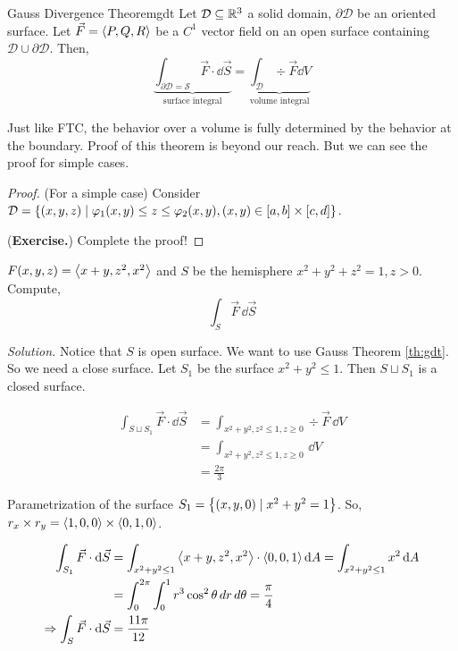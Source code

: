 \documentclass[../Analysis-3.tex]{subfiles}
\begin{document}
\begin{Thm}{Gauss Divergence Theorem}{gdt}
  Let $\mathcal{D} \subseteq \mathbb{R}^3$ a solid domain, $\partial{\mathcal{D}}$ be an oriented surface. Let $\vec{F} = \left\langle {P}, {Q,R} \right\rangle$ be a $C^1$ vector field on an open surface containing $\mathcal{D} \cup \partial{\mathcal{D}}$. Then,
  \[
    \underbrace{\int_{\partial{\mathcal{D}} = \mathcal{S}} \vec{F}\cdot \dd{\vec{S}}}_\text{surface integral} = \underbrace{\int_{\mathcal{D}} \div \vec{F} \dd{V}}_\text{volume integral}
  \]
\end{Thm}

Just like FTC, the behavior over a volume is fully determined by the behavior at the boundary. Proof of this theorem is beyond our reach. But we can see the proof for simple cases.

\begin{proof}
  (For a simple case) Consider $\mathcal{D} = \qty{(x,y,z) \mid \varphi_1(x,y) \leq z \leq \varphi_2(x,y), (x,y) \in [a,b]\times [c,d]}$.

  (\textbf{Exercise.}) Complete the proof!
\end{proof}


\begin{Eg}{}{}
  $F (x,y,z) = \left\langle {x+y}, {z^2,x^2} \right\rangle$ and $S$ be the hemisphere $x^2+y^2+z^2 = 1, z>0$. Compute,
  \[\int_{S} \vec{F} \, \dd \vec{S}\]

  \textit{Solution.} Notice that $S$ is open surface. We want to  use Gauss Theorem \ref{th:gdt}. So we need a close surface. Let $S_1$ be the surface $x^2 +y^2 \leq 1$. Then $S \sqcup S_1$ is a closed surface.

  \begin{align*}
    \int_{S \sqcup S_1} \vec{F}\cdot \dd \vec{S}
     & = \int_{x^2+y^2,z^2 \leq 1, z \ge 0} \div \vec{F} \, \dd{V} \\
     & = \int_{x^2+y^2,z^2 \leq 1, z \ge 0}\,\dd{V}                \\
     & = \frac{2\pi}{3}
  \end{align*}

  Parametrization of the surface $S_1 =\qty{(x,y,0) \mid x^2+y^2 = 1}$. So, $r_x \times r_y = \left\langle {1,0}, {0} \right\rangle \times \left\langle {0,1}, {0} \right\rangle$.

  \begin{align*}
    \int_{S_1} \vec{F} \cdot \dd \vec{S}
     & = \int_{x^2+y^2 \leq 1} \left\langle {x+y}, {z^2,x^2} \right\rangle \cdot \left\langle {0,0}, {1} \right\rangle \dd{A} = \int_{x^2+y^2 \leq 1} x^2 \dd{A} \\
     & = \int_{0}^{2\pi} \int_{0}^{1} r^3 \cos^2 \theta \,dr \,d\theta = \frac{\pi}{4}                         \\
    \Rightarrow \int_{S} \vec{F} \cdot \dd \vec{S}
     & = \frac{11\pi}{12}
  \end{align*}
\end{Eg}
\end{document}
